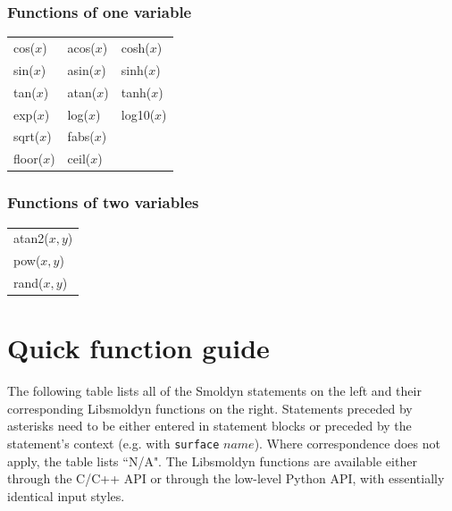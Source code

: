 \documentclass {book}
\newcommand {\ttt} {\texttt}
\begin{document}
\subsection*{Functions of one variable}

\begin{longtable}[c]{lll}
cos($x$) & acos($x$) & cosh($x$)\\
sin($x$) & asin($x$) & sinh($x$)\\
tan($x$) & atan($x$) & tanh($x$)\\
exp($x$) & log($x$) & log10($x$)\\
sqrt($x$) & fabs($x$)\\
floor($x$) & ceil($x$)
\end{longtable}

\subsection*{Functions of two variables}

\begin{longtable}[c]{l}
atan2($x,y$)\\
pow($x,y$)\\
rand($x,y$)
\end{longtable}


\chapter{Quick function guide}

The following table lists all of the Smoldyn statements on the left and their corresponding Libsmoldyn functions on the right. Statements preceded by asterisks need to be either entered in statement blocks or preceded by the statement's context (e.g. with \ttt{surface} $name$). Where correspondence does not apply, the table lists ``N/A". The Libsmoldyn functions are available either through the C/C++ API or through the low-level Python API, with essentially identical input styles.
\end{document}
